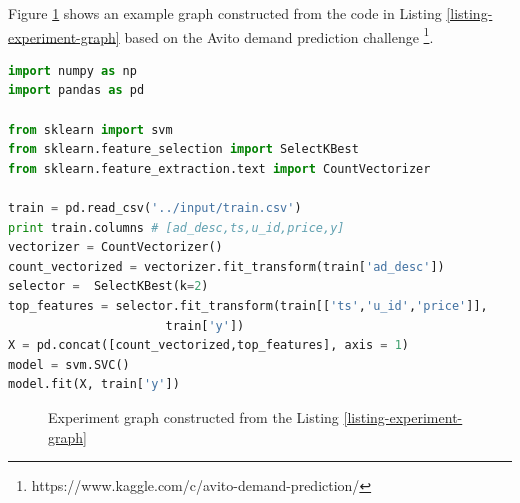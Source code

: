%

Figure \ref{fig-experiment-graph} shows an example graph constructed from the code in Listing \ref{listing-experiment-graph} based on the Avito demand prediction challenge \footnote{https://www.kaggle.com/c/avito-demand-prediction/}.

\begin{lstlisting}[language=Python, caption=Example script,captionpos=b,label = {listing-experiment-graph}]
import numpy as np
import pandas as pd

from sklearn import svm
from sklearn.feature_selection import SelectKBest
from sklearn.feature_extraction.text import CountVectorizer

train = pd.read_csv('../input/train.csv') 
print train.columns # [ad_desc,ts,u_id,price,y]
vectorizer = CountVectorizer()
count_vectorized = vectorizer.fit_transform(train['ad_desc'])
selector =  SelectKBest(k=2)
top_features = selector.fit_transform(train[['ts','u_id','price']], 
				      train['y'])
X = pd.concat([count_vectorized,top_features], axis = 1)
model = svm.SVC()
model.fit(X, train['y'])
\end{lstlisting}

\begin{figure}
\centering

\caption{Experiment graph constructed from the Listing \ref{listing-experiment-graph}}
\label{fig-experiment-graph}
\end{figure}

